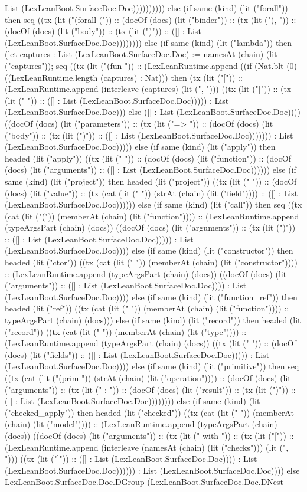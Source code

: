 \documentclass[11pt]{article}
\begin{document}
List (LexLeanBoot.SurfaceDoc.Doc)))))))))) else (if same (kind) (lit ("forall")) then seq ((tx (lit ("(forall (")) :: (docOf (docs) (lit ("binder")) :: (tx (lit ("), ")) :: (docOf (docs) (lit ("body")) :: (tx (lit (")")) :: ([] : List (LexLeanBoot.SurfaceDoc.Doc)))))))) else (if same (kind) (lit ("lambda")) then (let captures : List (LexLeanBoot.SurfaceDoc.Doc) := namesAt (chain) (lit ("captures")); seq ((tx (lit ("(fun ")) :: (LexLeanRuntime.append ((if (Nat.blt (0) ((LexLeanRuntime.length (captures) : Nat))) then (tx (lit ("[")) :: (LexLeanRuntime.append (interleave (captures) (lit (", "))) ((tx (lit ("]")) :: (tx (lit (" ")) :: ([] : List (LexLeanBoot.SurfaceDoc.Doc))))) : List (LexLeanBoot.SurfaceDoc.Doc))) else ([] : List (LexLeanBoot.SurfaceDoc.Doc)))) ((docOf (docs) (lit ("parameters")) :: (tx (lit ("=> ")) :: (docOf (docs) (lit ("body")) :: (tx (lit (")")) :: ([] : List (LexLeanBoot.SurfaceDoc.Doc))))))) : List (LexLeanBoot.SurfaceDoc.Doc))))) else (if same (kind) (lit ("apply")) then headed (lit ("apply")) ((tx (lit (" ")) :: (docOf (docs) (lit ("function")) :: (docOf (docs) (lit ("arguments")) :: ([] : List (LexLeanBoot.SurfaceDoc.Doc)))))) else (if same (kind) (lit ("project")) then headed (lit ("project")) ((tx (lit (" ")) :: (docOf (docs) (lit ("value")) :: (tx (cat (lit (" ")) (strAt (chain) (lit ("field")))) :: ([] : List (LexLeanBoot.SurfaceDoc.Doc)))))) else (if same (kind) (lit ("call")) then seq ((tx (cat (lit ("(")) (memberAt (chain) (lit ("function")))) :: (LexLeanRuntime.append (typeArgsPart (chain) (docs)) ((docOf (docs) (lit ("arguments")) :: (tx (lit (")")) :: ([] : List (LexLeanBoot.SurfaceDoc.Doc))))) : List (LexLeanBoot.SurfaceDoc.Doc)))) else (if same (kind) (lit ("constructor")) then headed (lit ("ctor")) ((tx (cat (lit (" ")) (memberAt (chain) (lit ("constructor")))) :: (LexLeanRuntime.append (typeArgsPart (chain) (docs)) ((docOf (docs) (lit ("arguments")) :: ([] : List (LexLeanBoot.SurfaceDoc.Doc)))) : List (LexLeanBoot.SurfaceDoc.Doc)))) else (if same (kind) (lit ("function\_ref")) then headed (lit ("ref")) ((tx (cat (lit (" ")) (memberAt (chain) (lit ("function")))) :: typeArgsPart (chain) (docs))) else (if same (kind) (lit ("record")) then headed (lit ("record")) ((tx (cat (lit (" ")) (memberAt (chain) (lit ("type")))) :: (LexLeanRuntime.append (typeArgsPart (chain) (docs)) ((tx (lit (" ")) :: (docOf (docs) (lit ("fields")) :: ([] : List (LexLeanBoot.SurfaceDoc.Doc))))) : List (LexLeanBoot.SurfaceDoc.Doc)))) else (if same (kind) (lit ("primitive")) then seq ((tx (cat (lit ("(prim ")) (strAt (chain) (lit ("operation")))) :: (docOf (docs) (lit ("arguments")) :: (tx (lit (" : ")) :: (docOf (docs) (lit ("result")) :: (tx (lit (")")) :: ([] : List (LexLeanBoot.SurfaceDoc.Doc)))))))) else (if same (kind) (lit ("checked\_apply")) then headed (lit ("checked")) ((tx (cat (lit (" ")) (memberAt (chain) (lit ("model")))) :: (LexLeanRuntime.append (typeArgsPart (chain) (docs)) ((docOf (docs) (lit ("arguments")) :: (tx (lit (" with ")) :: (tx (lit ("[")) :: (LexLeanRuntime.append (interleave (namesAt (chain) (lit ("checks"))) (lit (", "))) ((tx (lit ("]")) :: ([] : List (LexLeanBoot.SurfaceDoc.Doc)))) : List (LexLeanBoot.SurfaceDoc.Doc)))))) : List (LexLeanBoot.SurfaceDoc.Doc)))) else LexLeanBoot.SurfaceDoc.Doc.DGroup (LexLeanBoot.SurfaceDoc.Doc.DNest 
\end{document}
